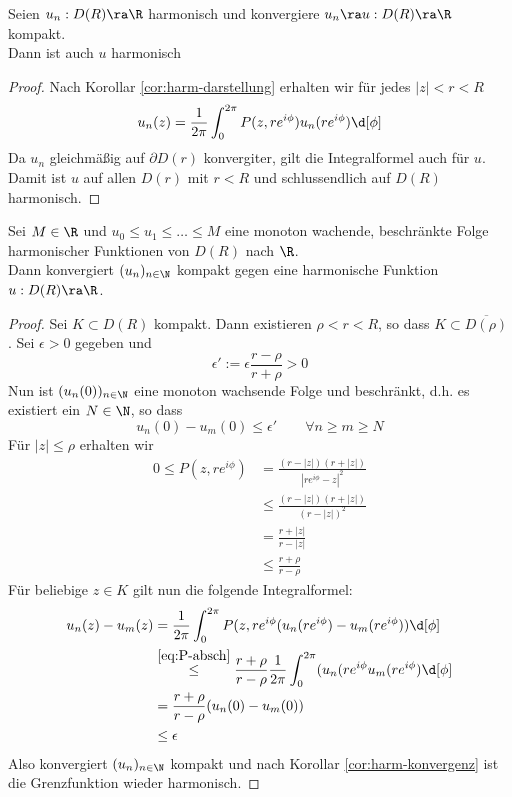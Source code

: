 \begin{cor}
  \label{cor:harm-konvergenz}
  Seien $u_n : D(R) \ra \R$ harmonisch und konvergiere $u_n \ra u:
  D(R) \ra \R$ kompakt. \\
  Dann ist auch $u$ harmonisch
\end{cor}

\begin{proof}
  Nach Korollar \ref{cor:harm-darstellung} erhalten wir für jedes $|z|
  < r <R$
  \[
  u_n(z) = \frac{1}{2\pi} \int_0^{2\pi} P(z, re^{i\phi})
  u_n(re^{i\phi}) \d[\phi]
  \]
  Da $u_n$ gleichmäßig auf $\partial D(r)$ konvergiter, gilt die
  Integralformel auch für $u$. Damit ist $u$ auf allen $D(r)$ mit $r <
  R$ und schlussendlich auf $D(R)$ harmonisch.
\end{proof}

\begin{thm}
  \label{thm:harnack}
  Sei $M \in \R$ und $u_0 \leq u_1 \leq \dots \leq M$ eine monoton
  wachende, beschränkte Folge harmonischer Funktionen von $D(R)$ nach
  $\R$. \\
  Dann konvergiert $(u_n)_{n\in \N}$ kompakt gegen eine harmonische
  Funktion $u: D(R) \ra \R$.
\end{thm}

\begin{proof}
  Sei $K \subset D(R)$ kompakt. Dann existieren $\rho < r < R$, so
  dass $K \subset \overline{D(\rho)}$. Sei $\epsilon > 0$ gegeben und
  \[
  \epsilon' := \epsilon \frac{r - \rho}{ r+ \rho} > 0
  \]
  Nun ist $(u_n(0))_{n \in \N}$ eine monoton wachsende Folge und
  beschränkt, d.h. es existiert ein $N \in \N$, so dass
  \[
  u_n(0) - u_m(0) \leq \epsilon' \qquad \forall n \geq m \geq N
  \]
  Für $|z| \leq \rho$ erhalten wir
  \begin{align*}
    0 \leq P(z, re^{i\phi}) & = \frac{(r - |z|)(r+|z|)}{|re^{i\phi} -
      z|^2} \\
    & \leq \frac{(r- |z|)(r + |z|)}{(r - |z|)^2} \\
    & = \frac{r + |z|}{r - |z|} \\
    & \leq \frac{ r + \rho}{ r - \rho} \label{eq:P-absch} \tag{blubb}
  \end{align*}
  Für beliebige $z \in K$ gilt nun die folgende Integralformel:
  \begin{align*}
    u_n(z) - u_m(z) & = \frac{1}{2\pi} \int_0^{2\pi} P(z, re^{i\phi}
    (u_n(re^{i\phi}) - u_m(re^{i\phi})) \d[\phi] \\
    & \stackrel{\eqref{eq:P-absch}}{\leq} \frac{r + \rho}{r - \rho}
    \frac{1}{2\pi} \int_0^{2\pi} (u_n(r e^{i\phi} u_m(re^{i\phi})
    \d[\phi] \\
    & = \frac{r+\rho}{r - \rho} (u_n(0) - u_m(0)) \\
    & \leq \epsilon 
  \end{align*}
  Also konvergiert $(u_n)_{n \in \N}$ kompakt und nach Korollar
  \ref{cor:harm-konvergenz} ist die Grenzfunktion wieder harmonisch.
\end{proof}

